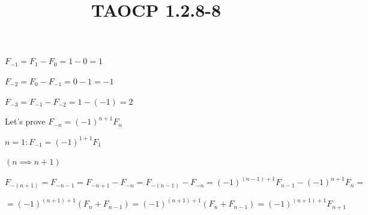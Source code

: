 \documentclass{article}
\title{TAOCP 1.2.8\mbox{-}8}
\begin{document}
\maketitle

\( F_{-1} = F_{1} - F_{0} = 1-0 = 1 \)

\( F_{-2} = F_{0} - F_{-1} = 0-1 = -1 \)

\( F_{-3} = F_{-1} - F_{-2} = 1 - (-1) = 2 \)

Let's prove \( F_{-n} = {(-1)}^{n+1}F_{n} \)

\( n = 1: F_{-1} = {(-1)}^{1+1}F_{1} \)

\( (n \implies n + 1) \)

\( F_{-(n+1)} = F_{-n-1} = F_{-n+1} - F_{-n} = F_{-(n-1)} - F_{-n} = {(-1)}^{(n-1)+1}F_{n-1} - {(-1)}^{n+1}F_{n} = \)

\( = {(-1)}^{(n+1)+1}(F_{n} + F_{n-1}) = {(-1)}^{(n+1)+1}(F_{n} + F_{n-1}) = {(-1)}^{(n+1)+1} F_{n+1} \)
\end{document}
